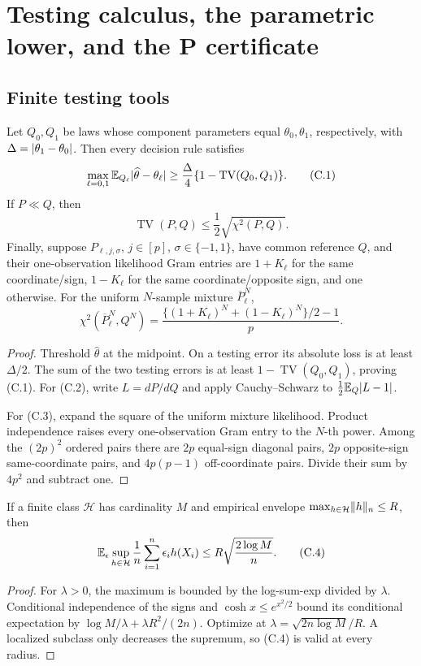 \section{Testing calculus, the parametric lower, and the P certificate}
\label{app:qp}

\subsection{Finite testing tools}
\label{app:lower-tools}

\begin{lemma}
\label{lem:testing-tools}
Let \(Q_0,Q_1\) be laws whose component parameters equal
\(\theta_0,\theta_1\), respectively, with
\(\Delta=\lvert \theta_1-\theta_0\rvert\).  Then every decision rule satisfies
\[
 \max_{\ell=0,1}\mathbb E_{Q_\ell}\lvert \widehat\theta-\theta_\ell\rvert
 \ge\frac{\Delta}{4}\{1-\operatorname{TV}(Q_0,Q_1)\}.
 \tag{C.1}
\]
If \(P\ll Q\), then
\[
 \operatorname{TV}(P,Q)
 \le\frac12\sqrt{\chi^2(P,Q)}.
 \tag{C.2}
\]
Finally, suppose \(P_{\ell,j,\sigma}\), \(j\in[p]\),
\(\sigma\in\{-1,1\}\), have common reference \(Q\), and their one-observation
likelihood Gram entries are \(1+K_\ell\) for the same coordinate/sign,
\(1-K_\ell\) for the same coordinate/opposite sign, and one otherwise.
For the uniform \(N\)-sample mixture \(\overline P_\ell^N\),
\[
 \chi^2(\overline P_\ell^N,Q^N)
 =\frac{\{(1+K_\ell)^N+(1-K_\ell)^N\}/2-1}{p}.
 \tag{C.3}
\]
\end{lemma}
\begin{proof}
Threshold \(\widehat\theta\) at the midpoint.  On a testing error its
absolute loss is at least \(\Delta/2\).  The sum of the two testing errors is
at least \(1-\operatorname{TV}(Q_0,Q_1)\), proving (C.1).
For (C.2), write \(L=dP/dQ\) and apply Cauchy--Schwarz to
\(\frac12\mathbb E_Q\lvert L-1\rvert\).

For (C.3), expand the square of the uniform mixture likelihood.  Product
independence raises every one-observation Gram entry to the \(N\)-th power.
Among the \((2p)^2\) ordered pairs there are \(2p\) equal-sign diagonal
pairs, \(2p\) opposite-sign same-coordinate pairs, and \(4p(p-1)\)
off-coordinate pairs.  Divide their sum by \(4p^2\) and subtract one.
\end{proof}

\begin{lemma}
\label{lem:massart}
If a finite class \(\mathcal H\) has cardinality \(M\) and empirical
envelope \(\max_{h\in\mathcal H}\lVert h\rVert_n\le R\), then
\[
 \mathbb E_\epsilon\sup_{h\in\mathcal H}
 \frac1n\sum_{i=1}^n\epsilon_ih(X_i)
 \le R\sqrt{\frac{2\log M}{n}}.
 \tag{C.4}
\]
\end{lemma}
\begin{proof}
For \(\lambda>0\), the maximum is bounded by the log-sum-exp divided by
\(\lambda\).  Conditional independence of the signs and
\(\cosh x\le e^{x^2/2}\) bound its conditional expectation by
\(\log M/\lambda+\lambda R^2/(2n)\).  Optimize at
\(\lambda=\sqrt{2n\log M}/R\).  A localized subclass only decreases the
supremum, so (C.4) is valid at every radius.
\end{proof}

